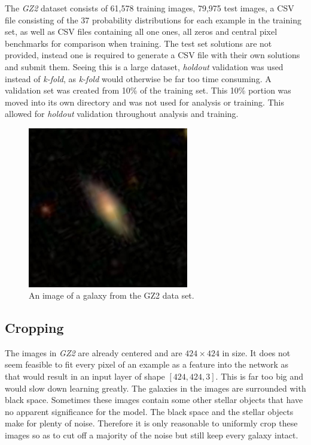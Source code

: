 \documentclass[12pt,a4paper,oneside,oldfontcommands]{memoir}
\begin{document}
The \textit{GZ2} dataset consists of 61,578 training images, 79,975 test images, a CSV file consisting of the 37 probability distributions for each example in the training set, as well as CSV files containing all one ones, all zeros and central pixel benchmarks for comparison when training. The test set solutions are not provided, instead one is required to generate a CSV file with their own solutions and submit them. Seeing this is a large dataset, \textit{holdout} validation was used instead of \textit{k-fold}, as \textit{k-fold} would otherwise be far too time consuming. A validation set was created from 10\% of the training set. This 10\% portion was moved into its own directory and was not used for analysis or training. This allowed for \textit{holdout} validation throughout analysis and training.


    \begin{figure}[ht]
    \center
      \includegraphics[width=7cm]{images/100023.jpg}
      \caption{An image of a galaxy from the GZ2 data set.}
      \label{fig:GZ2-1}
    \end{figure}
      

\subsection{Cropping} \label{Cropping}

The images in \textit{GZ2} are already centered and are \(424\times424\) in size. It does not seem feasible to fit every pixel of an example as a feature into the network as that would result in an input layer of shape \([424, 424, 3]\). This is far too big and would slow down learning greatly. The galaxies in the images are surrounded with black space. Sometimes these images contain some other stellar objects that have no apparent significance for the model. The black space and the stellar objects make for plenty of noise. Therefore it is only reasonable to uniformly crop these images so as to cut off a majority of the noise but still keep every galaxy intact. 
\end{document}
